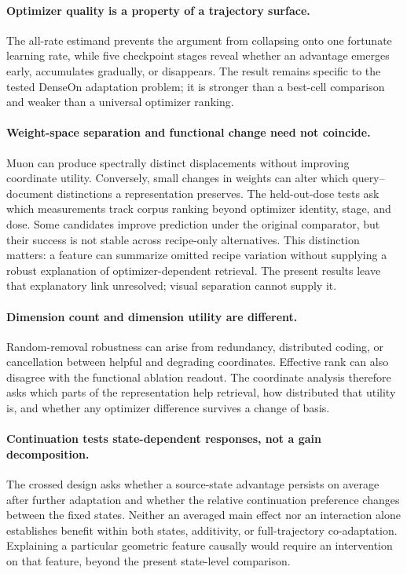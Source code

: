 \documentclass[11pt]{article}
\begin{document}
\paragraph{Optimizer quality is a property of a trajectory surface.}
The all-rate estimand prevents the argument from collapsing onto one fortunate learning rate, while
five checkpoint stages reveal whether an advantage emerges early, accumulates gradually, or
disappears. The result remains specific to the tested DenseOn adaptation problem; it is stronger
than a best-cell comparison and weaker than a universal optimizer ranking.

\paragraph{Weight-space separation and functional change need not coincide.}
Muon can produce spectrally distinct displacements without improving coordinate utility. Conversely,
small changes in weights can alter which query--document distinctions a representation preserves.
The held-out-dose tests ask which measurements track corpus ranking beyond optimizer identity,
stage, and dose. Some candidates improve prediction under the original comparator, but their
success is not stable across recipe-only alternatives. This distinction matters: a feature can
summarize omitted recipe variation without supplying a robust explanation of optimizer-dependent
retrieval. The present results leave that explanatory link unresolved; visual separation cannot
supply it.

\paragraph{Dimension count and dimension utility are different.}
Random-removal robustness can arise from redundancy, distributed coding, or cancellation between
helpful and degrading coordinates. Effective rank can also disagree with the functional ablation
readout. The coordinate analysis therefore asks which parts of the representation help retrieval,
how distributed that utility is, and whether any optimizer difference survives a change of basis.

\paragraph{Continuation tests state-dependent responses, not a gain decomposition.}
The crossed design asks whether a source-state advantage persists on average after further
adaptation and whether the relative continuation preference changes between the fixed states.
Neither an averaged main effect nor an interaction alone establishes benefit within both states,
additivity, or full-trajectory co-adaptation. Explaining a particular geometric feature causally
would require an intervention on that feature, beyond the present state-level comparison.
\end{document}
